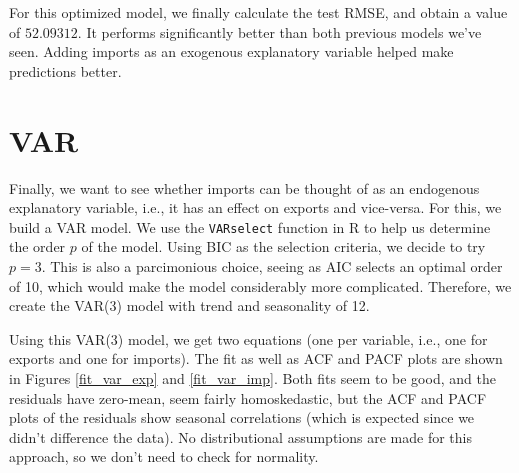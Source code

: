 \documentclass[]{article}
\begin{document}
For this optimized model, we finally calculate the test RMSE, and obtain a value of $52.09312$. It performs significantly better than both previous models we've seen. Adding imports as an exogenous explanatory variable helped make predictions better.

\newpage
\section{VAR}
Finally, we want to see whether imports can be thought of as an endogenous explanatory variable, i.e., it has an effect on exports and vice-versa. For this, we build a VAR model. We use the \texttt{VARselect} function in R to help us determine the order $p$ of the model. Using BIC as the selection criteria, we decide to try $p = 3$. This is also a parcimonious choice, seeing as AIC selects an optimal order of 10, which would make the model considerably more complicated. Therefore, we create the VAR(3) model with trend and seasonality of 12. 

Using this VAR(3) model, we get two equations (one per variable, i.e., one for exports and one for imports). The fit as well as ACF and PACF plots are shown in Figures \ref{fit_var_exp} and \ref{fit_var_imp}. Both fits seem to be good, and the residuals have zero-mean, seem fairly homoskedastic, but the ACF and PACF plots of the residuals show seasonal correlations (which is expected since we didn't difference the data). No distributional assumptions are made for this approach, so we don't need to check for normality.
\end{document}
